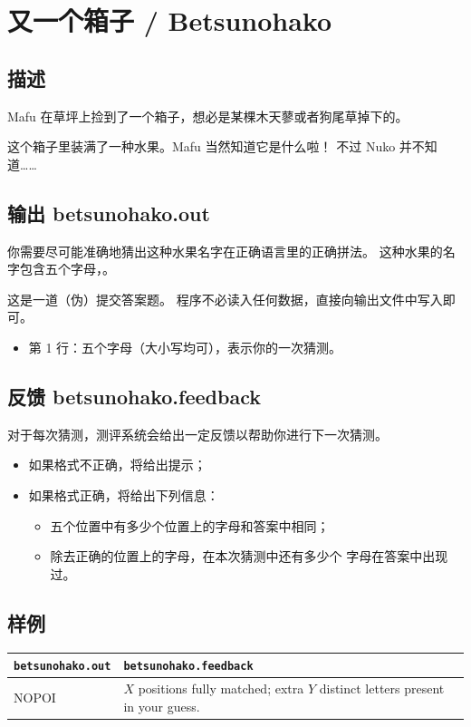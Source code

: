 \documentclass[UTF8, 11pt, a4paper]{article}
\begin{document}
\section*{又一个箱子 / Betsunohako}

\subsection*{描述}
Mafu 在草坪上捡到了一个箱子，想必是某棵木天蓼或者狗尾草掉下的。

这个箱子里装满了一种水果。Mafu 当然知道它是什么啦！%
不过 Nuko 并不知道……

\subsection*{输出 \makebox[0.5em]{} \small{betsunohako.out}}
你需要尽可能准确地猜出这种水果名字在正确语言里的正确拼法。%
这种水果的名字包含五个字母，。

这是一道（伪）提交答案题。%
程序不必读入任何数据，直接向输出文件中写入即可。

\begin{itemize}
    \item 第 1 行：五个字母（大小写均可），表示你的一次猜测。
\end{itemize}

\subsection*{反馈 \makebox[0.5em]{} \small{betsunohako.feedback}}
对于每次猜测，测评系统会给出一定反馈以帮助你进行下一次猜测。
\begin{itemize}
    \item 如果格式不正确，将给出提示；
    \item 如果格式正确，将给出下列信息：
    \begin{itemize}
        \item 五个位置中有多少个位置上的字母和答案中相同；
        \item 除去正确的位置上的字母，在本次猜测中还有多少个%
            字母在答案中出现过。
    \end{itemize}
\end{itemize}

\subsection*{样例}
\begin{table}[h]\centering
\begin{tabularx}{0.8 \textwidth}{|X|X|}
\hline
\texttt{\textbf{betsunohako.out}} & \texttt{\textbf{betsunohako.feedback}} \\ \hline
{\ttfamily
NOPOI
} & {\ttfamily
$X$ positions fully matched;\newline
extra $Y$ distinct letters present in your guess.
}
\\ \hline
\end{tabularx}\end{table}
\end{document}
